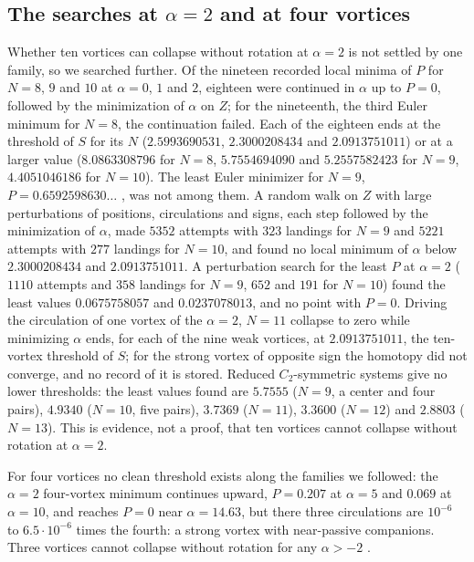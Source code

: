 \documentclass[11pt]{article}
\theoremstyle{definition}
\begin{document}
\subsection{The searches at \texorpdfstring{$\alpha = 2$}{alpha = 2} and at four vortices}\label{sec:searches}

Whether ten vortices can collapse without rotation at $\alpha = 2$ is not settled by one family, so we searched further. Of the nineteen recorded local minima of $P$ for $N = 8$, $9$ and $10$ at $\alpha = 0$, $1$ and $2$, eighteen were continued in $\alpha$ up to $P = 0$, followed by the minimization of $\alpha$ on $Z$; for the nineteenth, the third Euler minimum for $N = 8$, the continuation failed. Each of the eighteen ends at the threshold of $S$ for its $N$ ($2.5993690531$, $2.3000208434$ and $2.0913751011$) or at a larger value ($8.0863308796$ for $N = 8$, $5.7554694090$ and $5.2557582423$ for $N = 9$, $4.4051046186$ for $N = 10$). The least Euler minimizer for $N = 9$, $P = 0.6592598630\ldots$ \cite[Sect.~7]{mw2026}, was not among them. A random walk on $Z$ with large perturbations of positions, circulations and signs, each step followed by the minimization of $\alpha$, made $5352$ attempts with $323$ landings for $N = 9$ and $5221$ attempts with $277$ landings for $N = 10$, and found no local minimum of $\alpha$ below $2.3000208434$ and $2.0913751011$. A perturbation search for the least $P$ at $\alpha = 2$ ($1110$ attempts and $358$ landings for $N = 9$, $652$ and $191$ for $N = 10$) found the least values $0.0675758057$ and $0.0237078013$, and no point with $P = 0$. Driving the circulation of one vortex of the $\alpha = 2$, $N = 11$ collapse to zero while minimizing $\alpha$ ends, for each of the nine weak vortices, at $2.0913751011$, the ten-vortex threshold of $S$; for the strong vortex of opposite sign the homotopy did not converge, and no record of it is stored. Reduced $C_2$-symmetric systems give no lower thresholds: the least values found are $5.7555$ ($N = 9$, a center and four pairs), $4.9340$ ($N = 10$, five pairs), $3.7369$ ($N = 11$), $3.3600$ ($N = 12$) and $2.8803$ ($N = 13$). This is evidence, not a proof, that ten vortices cannot collapse without rotation at $\alpha = 2$.

For four vortices no clean threshold exists along the families we followed: the $\alpha = 2$ four-vortex minimum continues upward, $P = 0.207$ at $\alpha = 5$ and $0.069$ at $\alpha = 10$, and reaches $P = 0$ near $\alpha = 14.63$, but there three circulations are $10^{-6}$ to $6.5 \cdot 10^{-6}$ times the fourth: a strong vortex with near-passive companions. Three vortices cannot collapse without rotation for any $\alpha > -2$ \cite[Theorem~2]{mw2026}.
\end{document}
